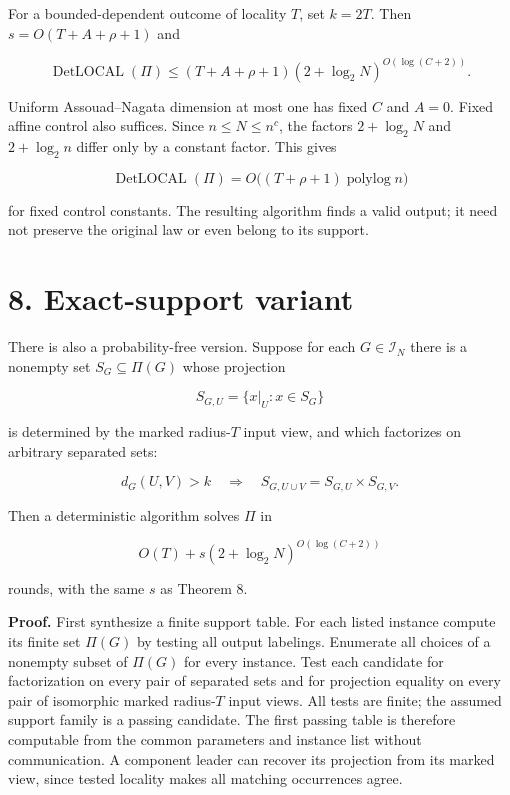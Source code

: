 \documentclass[11pt,a4paper]{article}
\begin{document}
For a bounded-dependent outcome of locality \(T\), set \(k=2T\).
Then \(s=O(T+A+\rho+1)\) and

\[ \operatorname{DetLOCAL}(\Pi) \le (T+A+\rho+1)(2+\log_2N)^{O(\log(C+2))}. \]

Uniform Assouad--Nagata dimension at most one has fixed \(C\) and \(A=0\).
Fixed affine control also suffices.
Since \(n\le N\le n^c\), the factors \(2+\log_2N\) and \(2+\log_2n\) differ only by a constant factor.
This gives

\[ \operatorname{DetLOCAL}(\Pi) =O\bigl((T+\rho+1)\operatorname{polylog}n\bigr) \]

for fixed control constants.
The resulting algorithm finds a valid output; it need not preserve the original law or even belong to its support.

\section{8. Exact-support variant}\label{exact-support-variant}

There is also a probability-free version.
Suppose for each \(G\in\mathcal I_N\) there is a nonempty set \(S_G\subseteq\Pi(G)\) whose projection

\[ S_{G,U}=\{x|_U:x\in S_G\} \]

is determined by the marked radius-\(T\) input view, and which factorizes on arbitrary separated sets:

\[ d_G(U,V)>k\quad\Longrightarrow\quad S_{G,U\cup V}=S_{G,U}\times S_{G,V}. \]

Then a deterministic algorithm solves \(\Pi\) in

\[ O(T)+s(2+\log_2N)^{O(\log(C+2))} \]

rounds, with the same \(s\) as Theorem 8.

\textbf{Proof.} First synthesize a finite support table.
For each listed instance compute its finite set \(\Pi(G)\) by testing all output labelings.
Enumerate all choices of a nonempty subset of \(\Pi(G)\) for every instance.
Test each candidate for factorization on every pair of separated sets and for projection equality on every pair of isomorphic marked radius-\(T\) input views.
All tests are finite; the assumed support family is a passing candidate.
The first passing table is therefore computable from the common parameters and instance list without communication.
A component leader can recover its projection from its marked view, since tested locality makes all matching occurrences agree.
\end{document}

